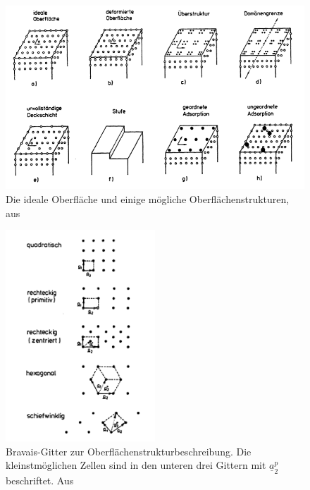 \begin{figure}
    \includegraphics[width=1.0\textwidth]{pics_theo/oberflaechenstruktur}
    \caption{Die ideale Oberfläche und einige mögliche Oberflächenstrukturen, 
aus \cite{henzler1991oberflachenphysik} }
    \label{fig:oberflaeche}
\end{figure} 
\begin{figure}
    \includegraphics[width=0.5\textwidth]{pics_theo/Bravais}
    \caption{Bravais-Gitter zur Oberflächenstrukturbeschreibung. Die kleinstmöglichen
Zellen sind in den unteren drei Gittern mit $\underline{a}_2^p$ beschriftet. 
Aus \cite{henzler1991oberflachenphysik} }
    \label{fig:Bravais}
\end{figure} 


